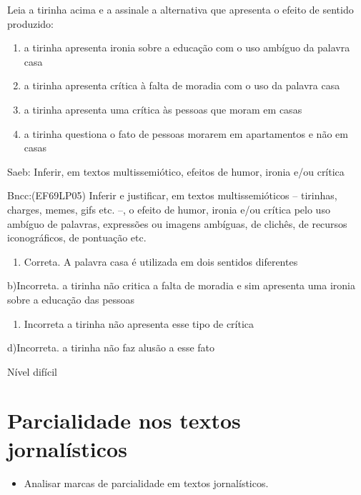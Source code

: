 {{\begin{escolha}
Leia a tirinha acima e a assinale a alternativa que apresenta o efeito
de sentido produzido:

\begin{enumerate}
\def\labelenumi{\alph{enumi})}
\item
  a tirinha apresenta ironia sobre a educação com o uso ambíguo da
  palavra casa
\item
  a tirinha apresenta crítica à falta de moradia com o uso da palavra
  casa
\item
  a tirinha apresenta uma crítica às pessoas que moram em casas
\item
  a tirinha questiona o fato de pessoas morarem em apartamentos e não em
  casas
\end{enumerate}

Saeb: Inferir, em textos multissemiótico, efeitos de humor, ironia e/ou
crítica

Bncc:(EF69LP05) Inferir e justificar, em textos multissemióticos --
tirinhas, charges, memes, gifs etc. --, o efeito de humor, ironia e/ou
crítica pelo uso ambíguo de palavras, expressões ou imagens ambíguas, de
clichês, de recursos iconográficos, de pontuação etc.

\begin{enumerate}
\def\labelenumi{\arabic{enumi}.}
\tightlist
\item
  Correta. A palavra casa é utilizada em dois sentidos diferentes
\end{enumerate}

b)Incorreta. a tirinha não critica a falta de moradia e sim apresenta
uma ironia sobre a educação das pessoas

\begin{enumerate}
\def\labelenumi{\arabic{enumi}.}
\tightlist
\item
  Incorreta a tirinha não apresenta esse tipo de crítica
\end{enumerate}

d)Incorreta. a tirinha não faz alusão a esse fato

Nível difícil


\chapter{Parcialidade nos textos jornalísticos}


\begin{itemize}

  \item Analisar marcas de parcialidade em textos jornalísticos.


\end{itemize}
\end{escolha}}}
